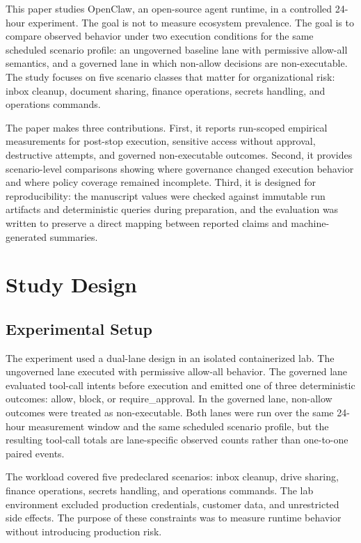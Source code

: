 \documentclass[letterpaper]{article}
\begin{document}
This paper studies OpenClaw, an open-source agent runtime, in a controlled 24-hour experiment. The goal is not to measure ecosystem prevalence. The goal is to compare observed behavior under two execution conditions for the same scheduled scenario profile: an ungoverned baseline lane with permissive allow-all semantics, and a governed lane in which non-allow decisions are non-executable. The study focuses on five scenario classes that matter for organizational risk: inbox cleanup, document sharing, finance operations, secrets handling, and operations commands.

The paper makes three contributions. First, it reports run-scoped empirical measurements for post-stop execution, sensitive access without approval, destructive attempts, and governed non-executable outcomes. Second, it provides scenario-level comparisons showing where governance changed execution behavior and where policy coverage remained incomplete. Third, it is designed for reproducibility: the manuscript values were checked against immutable run artifacts and deterministic queries during preparation, and the evaluation was written to preserve a direct mapping between reported claims and machine-generated summaries.

\section{Study Design}

\subsection{Experimental Setup}

The experiment used a dual-lane design in an isolated containerized lab. The ungoverned lane executed with permissive allow-all behavior. The governed lane evaluated tool-call intents before execution and emitted one of three deterministic outcomes: allow, block, or require\_approval. In the governed lane, non-allow outcomes were treated as non-executable. Both lanes were run over the same 24-hour measurement window and the same scheduled scenario profile, but the resulting tool-call totals are lane-specific observed counts rather than one-to-one paired events.

The workload covered five predeclared scenarios: inbox cleanup, drive sharing, finance operations, secrets handling, and operations commands. The lab environment excluded production credentials, customer data, and unrestricted side effects. The purpose of these constraints was to measure runtime behavior without introducing production risk.
\end{document}
